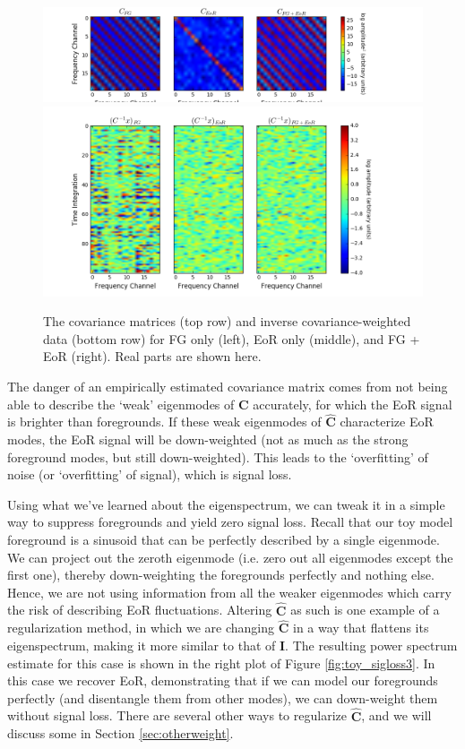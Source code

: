 \documentclass[preprint2,numberedappendix,tighten]{aastex6}  %
\begin{document}
\begin{figure}
	\centering
	\includegraphics[trim={1.5cm 0.1cm 3.5cm 0.1cm},clip,width=\columnwidth]{plots/toy_sigloss12.png}
	\includegraphics[trim={1.5cm 0.1cm 3.5cm 0.1cm},clip,width=\columnwidth]{plots/toy_sigloss13.png}
	\caption{The covariance matrices (top row) and inverse covariance-weighted data (bottom row) for FG only (left), EoR only (middle), and FG + EoR (right). Real parts are shown here.}
	\label{fig:toy_sigloss12}
\end{figure}

The danger of an empirically estimated covariance matrix comes from not being able to describe the `weak' eigenmodes of $\textbf{C}$ accurately, for which the EoR signal is brighter than foregrounds. If these weak eigenmodes of $\hat{\textbf{C}}$ characterize EoR modes, the EoR signal will be down-weighted (not as much as the strong foreground modes, but still down-weighted). This leads to the `overfitting' of noise (or `overfitting' of signal), which is signal loss. 

Using what we've learned about the eigenspectrum, we can tweak it in a simple way to suppress foregrounds and yield zero signal loss. Recall that our toy model foreground is a sinusoid that can be perfectly described by a single eigenmode. We can project out the zeroth eigenmode (i.e. zero out all eigenmodes except the first one), thereby down-weighting the foregrounds perfectly and nothing else. Hence, we are not using information from all the weaker eigenmodes which carry the risk of describing EoR fluctuations. Altering $\hat{\textbf{C}}$ as such is one example of a regularization method, in which we are changing $\hat{\textbf{C}}$ in a way that flattens its eigenspectrum, making it more similar to that of $\textbf{I}$. The resulting power spectrum estimate for this case is shown in the right plot of Figure \ref{fig:toy_sigloss3}. In this case we recover EoR, demonstrating that if we can model our foregrounds perfectly (and disentangle them from other modes), we can down-weight them without signal loss. There are several other ways to regularize $\hat{\textbf{C}}$, and we will discuss some in Section \ref{sec:otherweight}.
\end{document}
